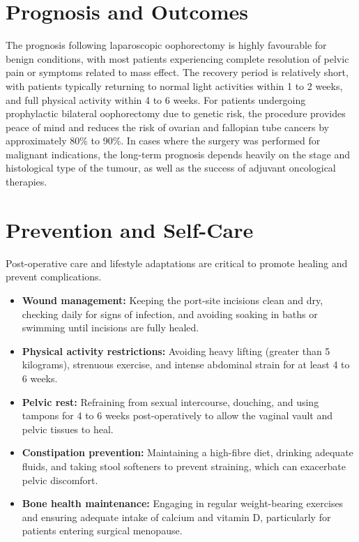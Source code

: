 \section*{Prognosis and Outcomes}
The prognosis following laparoscopic oophorectomy is highly favourable for benign conditions, with most patients experiencing complete resolution of pelvic pain or symptoms related to mass effect. The recovery period is relatively short, with patients typically returning to normal light activities within 1 to 2 weeks, and full physical activity within 4 to 6 weeks. For patients undergoing prophylactic bilateral oophorectomy due to genetic risk, the procedure provides peace of mind and reduces the risk of ovarian and fallopian tube cancers by approximately 80\% to 90\%. In cases where the surgery was performed for malignant indications, the long-term prognosis depends heavily on the stage and histological type of the tumour, as well as the success of adjuvant oncological therapies.

\section*{Prevention and Self-Care}
Post-operative care and lifestyle adaptations are critical to promote healing and prevent complications.
\begin{itemize}
    \item \textbf{Wound management:} Keeping the port-site incisions clean and dry, checking daily for signs of infection, and avoiding soaking in baths or swimming until incisions are fully healed.
    \item \textbf{Physical activity restrictions:} Avoiding heavy lifting (greater than 5 kilograms), strenuous exercise, and intense abdominal strain for at least 4 to 6 weeks.
    \item \textbf{Pelvic rest:} Refraining from sexual intercourse, douching, and using tampons for 4 to 6 weeks post-operatively to allow the vaginal vault and pelvic tissues to heal.
    \item \textbf{Constipation prevention:} Maintaining a high-fibre diet, drinking adequate fluids, and taking stool softeners to prevent straining, which can exacerbate pelvic discomfort.
    \item \textbf{Bone health maintenance:} Engaging in regular weight-bearing exercises and ensuring adequate intake of calcium and vitamin D, particularly for patients entering surgical menopause.
\end{itemize}

